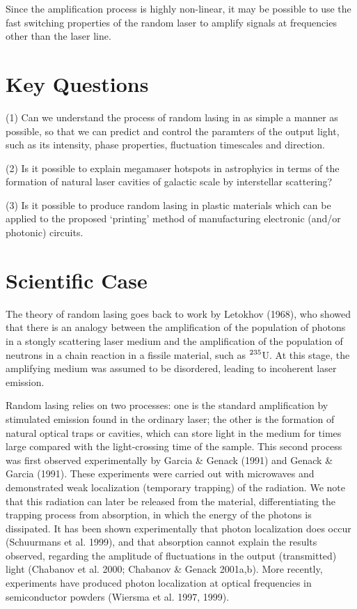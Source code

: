 Since the amplification process is highly non-linear, it may be possible to
use the fast switching properties of the random laser to amplify signals
at frequencies other than the laser line.

\section{Key Questions}

(1) Can we understand the process of random lasing in as simple a manner as
possible, so that we can predict and control the paramters of the output
light, such as its intensity, phase properties, fluctuation timescales
and direction.

(2) Is it possible to explain megamaser hotspots in astrophyics in terms of
the formation of natural laser cavities of galactic scale by interstellar
scattering?

(3) Is it possible to produce random lasing in plastic materials which can
be applied to the proposed `printing' method of manufacturing electronic
(and/or photonic) circuits.


\section{Scientific Case}

The theory of random lasing goes back to work by Letokhov (1968), who showed
that there is an analogy between the amplification of the population of
photons in a stongly scattering laser medium and the amplification of the
population of neutrons in a chain reaction in a fissile material, such
as $^{\rm 235}$U. At this stage, the amplifying medium was assumed to be
disordered, leading to incoherent laser emission.

Random lasing relies on two processes: one is the standard amplification by
stimulated emission found in the ordinary laser; the other is the formation
of natural optical traps or cavities, which can store light in the medium
for times large compared with the light-crossing time of the sample. This
second process was first observed experimentally by Garcia \&
Genack (1991) and Genack \& Garcia (1991). These experiments were carried out
with microwaves and demonstrated weak localization (temporary trapping) of
the radiation. We note that this radiation can later be released from the
material, differentiating the trapping process from absorption, in which the
energy of the photons is dissipated. It has been shown experimentally that
photon localization does occur (Schuurmans et al. 1999), and that absorption cannot explain the
results observed, regarding the amplitude of fluctuations in the output
(transmitted) light (Chabanov et al. 2000; Chabanov \& Genack 2001a,b). More recently, experiments have produced photon
localization
at optical frequencies in semiconductor powders (Wiersma et al. 1997, 1999).

